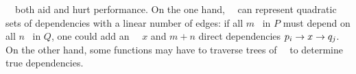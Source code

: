 \Noop\ \patches\ both aid and hurt performance.
%
On the one hand, \noop\ \patches\ can represent quadratic sets of dependencies
 with a linear number of edges: if all $m$ \patches\ in $P$ must depend on
 all $n$ \patches\ in $Q$, one could 
 add an \noop\ \patch\ $x$ and $m+n$ direct dependencies
 $p_i \rightarrow x \rightarrow q_j$.
%
On the other hand, some functions may have to traverse trees of \noop\
 \patches\ to determine true dependencies.


\begin{comment}
To solve this problem, we introduce an additional type of \patch. The
prototypical \patch\ corresponds to some change on disk, but \Kudos\ also
supports \aemphnoop\ \patch\ type, which doesn't change the disk at all.
\Noop\ \patches\ can have \befores, like other \patches, but they don't need to
be written to disk: they are trivially satisfied when all of their \befores\ are
satisfied. Thus, they can be used to ``stand for'' entire sets of other changes.
%
This capability is extremely useful, and is used by most operations on disk
structures so that a single \patch\ can be returned that depends on the whole
change. Likewise, \anoop\ \patch\ can be passed in as a parameter to a disk
operation to make the whole operation depend on a set of other changes. \Noop\
\patches\ allow dependencies between sets with only a linear number of
dependency edges in the \patch\ graph, and without having to pass around arrays
of \patches.
%
The cost is that some functions may have to traverse trees of \noop\ \patches\
to determine true dependencies.
\end{comment}
